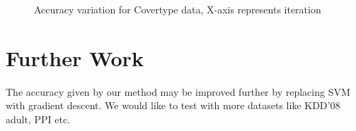 \documentclass{article} %
\begin{document}
\begin{figure}
\caption{Accuracy variation for Covertype data, X-axis represents iteration}
\label{fig:acc_cov}
\end{figure}

\section{Further Work}

The accuracy given by our method may be improved further by replacing SVM with gradient descent. We would like to test with more datasets like KDD'08 adult, PPI etc.
\end{document}
